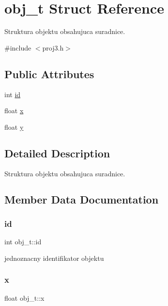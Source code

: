 \hypertarget{structobj__t}{}\section{obj\+\_\+t Struct Reference}
\label{structobj__t}


Struktura objektu obsahujuca suradnice.  




{\ttfamily \#include $<$proj3.\+h$>$}

\subsection*{Public Attributes}
\begin{DoxyCompactItemize}
\item 
int \hyperlink{structobj__t_a603ae185ae536cecefa2015ad574d4a3}{id}
\item 
float \hyperlink{structobj__t_af688845648ce2b4781c232c475d9fa81}{x}
\item 
float \hyperlink{structobj__t_a1101f5b48ee96a247c71aa8a33feb2bb}{y}
\end{DoxyCompactItemize}


\subsection{Detailed Description}
Struktura objektu obsahujuca suradnice. 

\subsection{Member Data Documentation}
\mbox{\label{structobj__t_a603ae185ae536cecefa2015ad574d4a3}} 
\subsubsection{\texorpdfstring{id}{id}}
{\footnotesize\ttfamily int obj\+\_\+t\+::id}

jednoznacny identifikator objektu \mbox{\label{structobj__t_af688845648ce2b4781c232c475d9fa81}} 
\subsubsection{\texorpdfstring{x}{x}}
{\footnotesize\ttfamily float obj\+\_\+t\+::x}

